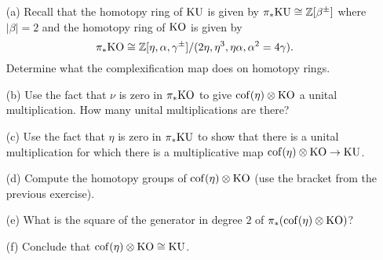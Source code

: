 \documentclass[reqno]{amsart}
\begin{document}
\begin{itemize}
\item[(a)] Recall that the homotopy ring of $\mathrm{KU}$ is given by
  $\pi_*\mathrm{KU} \cong \mathbb{Z}[\beta^\pm]$ where $|\beta|=2$ and
  the homotopy ring of $\mathrm{KO}$ is given by
  \[ \pi_*\mathrm{KO} \cong \mathbb{Z}[\eta, \alpha, \gamma^\pm]/(2\eta, \eta^3, \eta\alpha, \alpha^2=4\gamma). \]
  Determine what the complexification map does on homotopy rings.
\item[(b)] Use the fact that $\nu$ is zero in $\pi_*\mathrm{KO}$ to give
  $\operatorname{cof}(\eta) \otimes \mathrm{KO}$ a unital multiplication. How many unital multiplications are there?
\item[(c)] Use the fact that $\eta$ is zero in $\pi_*\mathrm{KU}$ to show that there is a unital multiplication for which there is a multiplicative map
  $\operatorname{cof}(\eta) \otimes \mathrm{KO} \to \mathrm{KU}$.
\item[(d)] Compute the homotopy groups of $\operatorname{cof}(\eta) \otimes \mathrm{KO}$
  (use the bracket from the previous exercise).
\item[(e)] What is the square of the generator in degree $2$ of
  $\pi_*(\operatorname{cof}(\eta) \otimes \mathrm{KO})$?
\item[(f)] Conclude that $\operatorname{cof}(\eta) \otimes \mathrm{KO} \cong \mathrm{KU}$.
\end{itemize}






\end{document}
